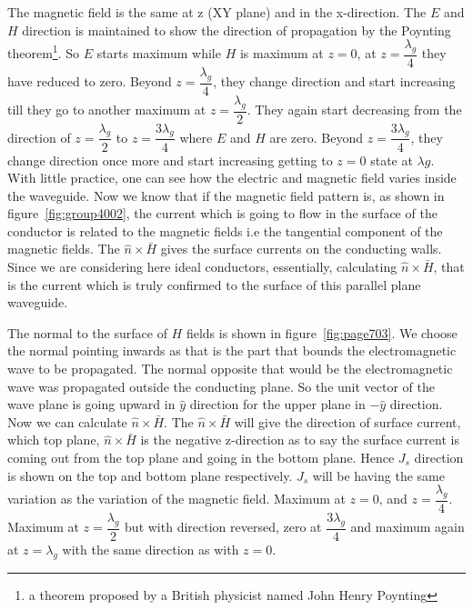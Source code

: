 The magnetic field is the same at z (XY plane) and in the x-direction. The $E$ and $H$ direction is maintained to show the direction of propagation by the Poynting theorem\footnote{a theorem proposed by a British physicist named John Henry Poynting}. So $E$ starts maximum while $H$ is maximum at $z=0$, at ${z= \dfrac{\lambda_g}{4}}$ they have reduced to zero. Beyond ${z= \dfrac{\lambda_g}{4}}$, they change direction and start increasing till they go to another maximum at ${z=\dfrac{\lambda_g}{2}}$. They again start decreasing from the direction of ${z=\dfrac{\lambda_g}{2}}$ to ${z=\dfrac{3\lambda_g}{4}}$ where $E$ and $H$ are zero. Beyond ${z=\dfrac{3\lambda_g}{4}}$,  they change direction once more and start increasing getting to $z=0$ state at ${\lambda g}$. With little practice, one can see how the electric and magnetic field varies inside the waveguide. Now we know that if the magnetic field pattern is, as shown in figure~\ref{fig:group4002}, the current which is going to flow in the surface of the conductor is related to the magnetic fields i.e the tangential component of the magnetic fields. The ${\hat{n}\times\bar{H}}$ gives the surface currents on the conducting walls. Since we are considering here ideal conductors, essentially, calculating ${\hat{n}\times\bar{H}}$, that is the current which is truly confirmed to the surface of this parallel plane waveguide. 

The normal to the surface of $H$ fields is shown in figure~\ref{fig:page703}. We choose the normal pointing inwards as that is the part that bounds the electromagnetic wave to be propagated. The normal opposite that would be the electromagnetic wave was propagated outside the conducting plane. So the unit vector of the wave plane is going upward in ${\hat{y}}$ direction for the upper plane in ${-\hat{y}}$ direction. Now we can calculate ${\hat{n}\times\bar{H}}$. The ${\hat{n}\times\bar{H}}$ will give the direction of surface current, which top plane, ${\hat{n}\times\bar{H}}$ is the negative z-direction as to say the surface current is coming out from the top plane and going in the bottom plane. Hence ${J_s}$ direction is shown on the top and bottom plane respectively. ${J_s}$ will be having the same variation as the variation of the magnetic field. Maximum at $z=0$, and ${z= \dfrac{\lambda_g}{4}}$. Maximum at ${z=\dfrac{\lambda_g}{2}}$ but with direction reversed, zero at ${\dfrac{3\lambda_g}{4}}$ and maximum again at ${z=\lambda_g}$ with the same direction as with $z=0$. 

